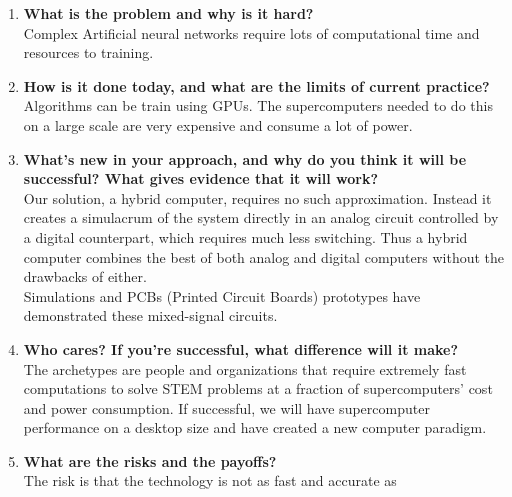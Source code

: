 \documentclass[12pt]{article}
\begin{document}
    \begin{enumerate}\large
        \item[\UUno]     
            \textbf{What is the problem and why is it hard?} \\
            Complex Artificial neural networks require lots of computational time and resources to training. 
            \\[-7.5mm]
        \item[\DDos]     
            \textbf{How is it done today, and what are the limits of current practice?}\\
            Algorithms can be train using GPUs. The supercomputers needed to do this on a large scale are 
            very expensive and consume a lot of power.
            \\[-7.5mm]
        \item[\TTres]    
            \textbf{What's new in your approach, 
            and why do you think it will be successful? 
            What gives evidence that it will work?}\\
            Our solution, a hybrid computer, requires no such approximation. Instead 
            it creates a simulacrum of the system directly in an analog circuit
            controlled by a digital counterpart, which requires much less switching. 
            Thus a hybrid computer combines the best
            of both analog and digital computers without the drawbacks of either.\\
            Simulations and PCBs (Printed Circuit Boards) prototypes have 
            demonstrated these mixed-signal circuits.
            \\[-7.5mm]
        \item[\CCuatro]  
            \textbf{Who cares? 
            If you're successful, what difference will it make?}\\
            The archetypes are people and organizations that require extremely fast 
            computations to solve STEM problems at a fraction of supercomputers' 
            cost and power consumption.
            If successful, we will have supercomputer performance on a desktop
            size and have created a new computer paradigm.
            \\[-7.5mm]
        \item[\CCinco]   
            \textbf{What are the risks and the payoffs?}\\
            The risk is that the technology is not as fast and accurate as

\end{enumerate}
\end{document}
